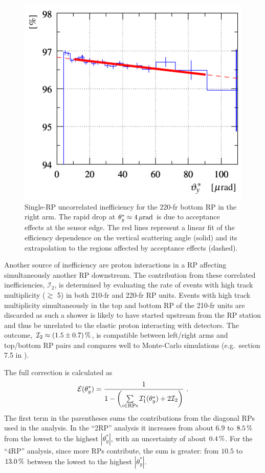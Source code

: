 \begin{figure}
\begin{center}
\includegraphics{fig/eff3outof4_fits.pdf}
\caption{%
Single-RP uncorrelated inefficiency for the 220-fr bottom RP in the right arm. The rapid drop at $\theta_y^* \approx 4\,{\rm \mu rad}$ is due to acceptance effects at the sensor edge. The red lines represent a linear fit of the efficiency dependence on the vertical scattering angle (solid) and its extrapolation to the regions affected by acceptance effects (dashed).
}
\label{fig:eff uncorr}
\end{center}
\end{figure}

Another source of inefficiency are proton interactions in a RP affecting simultaneously another RP downstream. The contribution from these correlated inefficiencies, $\mathcal{I}_2$, is determined by evaluating the rate of events with high track multiplicity ($\gtrsim$ 5) in both 210-fr and 220-fr RP units. Events with high track multiplicity simultaneously in the top and bottom RP of the 210-fr units are discarded as such a shower is likely to have started upstream from the RP station and thus be unrelated to the elastic proton interacting with detectors. The outcome, $\mathcal{I}_2 \approx (1.5 \pm 0.7)\,{\rm \%}$, is compatible between left/right arms and top/bottom RP pairs and compares well to Monte-Carlo simulations (e.g.~section 7.5 in \cite{hubert-thesis}).

The full correction is calculated as
\begin{equation}
\label{efficiency}
	\mathcal{E}(\theta_y^*) = {1\over 1 - \left( \sum\limits_{i\in \rm RPs} \mathcal{I}^i_1(\theta_y^*) + 2 \mathcal{I}_2 \right) } \ .
\end{equation}
The first term in the parentheses sums the contributions from the diagonal RPs used in the analysis. In the ``2RP'' analysis it increases from about $6.9$ to $8.5\,{\rm \%}$ from the lowest to the highest $|\theta_y^*|$, with an uncertainty of about $0.4\,{\rm \%}$. For the ``4RP'' analysis, since more RPs contribute, the sum is greater: from $10.5$ to $13.0\,{\rm \%}$ between the lowest to the highest $|\theta_y^*|$.



